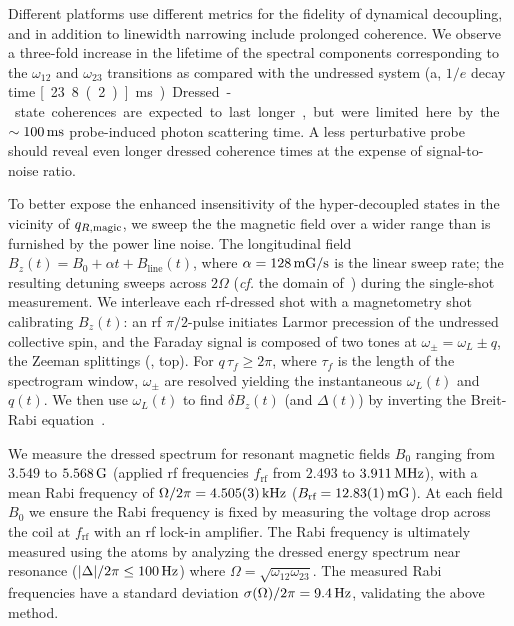 \documentclass[aps,prl,reprint,superscriptaddress,floatfix]{revtex4-1}
\begin{document}
Different platforms use different metrics for the fidelity of dynamical decoupling, and in addition to linewidth narrowing include prolonged coherence.
We observe a three-fold increase in the lifetime of the spectral components corresponding to the $\omega_{12}$ and $\omega_{23}$ transitions as compared with the undressed system (a, $1/e$ decay time \unit[23.8(2)]{ms}).
Dressed-state coherences are expected to last longer, but were limited here by the $\sim\unit[100]{ms}$ probe-induced photon scattering time.
A less perturbative probe~\cite{jasperse_magic-wavelength_2017} should reveal even longer dressed coherence times at the expense of signal-to-noise ratio. 

To better expose the enhanced insensitivity of the hyper-decoupled states in the vicinity of $q_{R,\text{magic}}$, we sweep the the magnetic field over a wider range than is furnished by the power line noise.
The longitudinal field $B_z(t) = B_0 + \alpha t + B_{\text{line}}(t)$, where $\alpha = \unit[128]{mG/s}$ is the linear sweep rate; the resulting detuning sweeps across $2\Omega$ (\textit{cf.} the domain of~) during the single-shot measurement.
We interleave each rf-dressed shot with a magnetometry shot calibrating $B_z(t)$: an rf $\pi/2$-pulse initiates Larmor precession of the undressed collective spin, and the Faraday signal is composed of two tones at $\omega_\pm = \omega_L \pm q$, the Zeeman splittings (, top).
For $q \, \tau_f \geq 2\pi$, where $\tau_f$ is the length of the spectrogram window, $\omega_\pm$ are resolved yielding the instantaneous $\omega_L(t)$ and $q(t)$.
We then use $\omega_L(t)$ to find $\delta B_z(t)$ (and $\Delta(t)$) by inverting the Breit-Rabi equation~\cite{ramsey_molecular_1956,Note3}.

We measure the dressed spectrum for resonant magnetic fields $B_0$ ranging from $3.549$ to $\unit[5.568]{G}$ (applied rf frequencies $f_{\text{rf}}$ from $2.493$ to $\unit[3.911]{MHz}$), with a mean Rabi frequency of $\Omega/2\pi = \unit[4.505(3)]{kHz}$ ($B_{\text{rf}} = \unit[12.83(1)]{mG}$).
At each field $B_0$ we ensure the Rabi frequency is fixed by measuring the voltage drop across the coil at $f_{\text{rf}}$ with an rf lock-in amplifier.
The Rabi frequency is ultimately measured using the atoms by analyzing the dressed energy spectrum near resonance ($\abs{\Delta}/2\pi \leq \unit[100]{Hz}$) where $\Omega = \sqrt{\omega_{12} \omega_{23}}$.
The measured Rabi frequencies have a standard deviation $\sigma(\Omega)/2\pi = \unit[9.4]{Hz}$, validating the above method.
\end{document}
